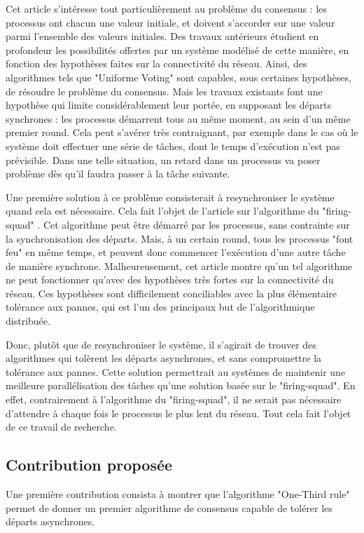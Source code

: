 \documentclass{article}
\begin{document}
Cet article s'intéresse tout particulièrement au problème du consensus : les processus ont chacun une valeur initiale, et doivent s'accorder sur une valeur parmi l'ensemble des valeurs initiales.
Des travaux antérieurs étudient en profondeur les possibilités offertes par un système modélisé de cette manière, en fonction des hypothèses faites sur la connectivité du réseau.
Ainsi, des algorithmes tels que "Uniforme Voting" sont capables, sous certaines hypothèses, de résoudre le problème du consensus.
Mais les travaux existants font une hypothèse qui limite considérablement leur portée, en supposant les départs synchrones : les processus démarrent tous au même moment, au sein d'un même premier round.
Cela peut s'avérer très contraignant, par exemple dans le cas où le système doit effectuer une série de tâches, dont le temps d'exécution n'est pas prévisible.
Dans une telle situation, un retard dans un processus va poser problème dès qu'il faudra passer à la tâche suivante.

Une première solution à ce problème consisterait à resynchroniser le système quand cela est nécessaire. Cela fait l'objet de l'article sur l'algorithme du "firing-squad" \cite{firing_squad}.
Cet algorithme peut être démarré par les processus, sans contrainte sur la synchronisation des départs. Mais, à un certain round, tous les processus "font feu" en même temps, et
peuvent donc commencer l'exécution d'une autre tâche de manière synchrone.
Malheureusement, cet article montre qu'un tel algorithme ne peut fonctionner qu'avec des hypothèses très fortes sur la connectivité du réseau.
Ces hypothèses sont difficilement conciliables avec la plus élémentaire tolérance aux pannes, qui est l'un des principaux but de l'algorithmique distribuée.

Donc, plutôt que de resynchroniser le système, il s'agirait de trouver des algorithmes qui tolèrent les départs asynchrones, et sans compromettre la tolérance aux pannes.
Cette solution permettrait au systèmes de maintenir une meilleure parallélisation des tâches qu'une solution basée sur le "firing-squad".
En effet, contrairement à l'algorithme du "firing-squad", il ne serait pas nécessaire d'attendre à chaque fois le processus le plus lent du réseau.
Tout cela fait l'objet de ce travail de recherche.

\subsection{Contribution proposée}

Une première contribution consista à montrer que l'algorithme "One-Third rule" \cite{otr} permet de donner un premier algorithme de consensus capable de tolérer les départs asynchrones.
\end{document}
